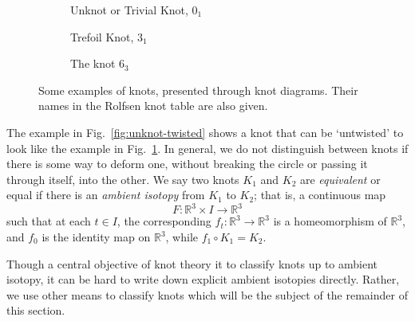 \documentclass[12pt]{report}
\newcommand{\R}{\mathbb{R}}
\theoremstyle{upright}
\begin{document}
\begin{figure}[hbt!]
	\centering
	\hspace*{\fill}
	\begin{subfigure}[b]{0.3 \textwidth}
		\centering
		\def\svgscale{0.2}
		
		\caption{Unknot or Trivial Knot, $0_{1}$}
		\label{fig:unknot}
	\end{subfigure}
	\hspace*{\fill}
	\begin{subfigure}[b]{0.3 \textwidth}
		\centering
		\def\svgscale{0.2}
		
		\caption{Trefoil Knot, $3_{1}$}
		\label{fig:trefoil}
	\end{subfigure}
	\hspace*{\fill}
	\begin{subfigure}[b]{0.3 \textwidth}
		\centering
		\def\svgscale{0.2}
		
		\caption{The knot $6_{3}$}
		\label{fig:6-3-knot}
	\end{subfigure}
	\caption{Some examples of knots, presented through knot diagrams. Their names in the Rolfsen knot table are also given.}
	\label{fig:knot-examples}
	\hspace*{\fill} 
\end{figure}

The example in Fig.~\ref{fig:unknot-twisted} shows a knot that can be `untwisted' to look like the example in Fig.~\ref{fig:unknot}. In general, we do not distinguish between knots if there is some way to deform one, without breaking the circle or passing it through itself, into the other. We say two knots $K_{1}$ and $K_{2}$ are \textit{equivalent} or equal if there is an \textit{ambient isotopy} from $K_{1}$ to $K_{2}$; that is, a continuous map
\[F: \R^{3} \times I \longrightarrow \R^{3}\]
such that at each $t \in I$, the corresponding $f_{t}: \R^{3} \longrightarrow \R^{3}$ is a homeomorphism of $\R^{3}$, and $f_{0}$ is the identity map on $\R^{3}$, while $f_{1} \circ K_{1} = K_{2}$.

Though a central objective of knot theory it to classify knots up to ambient isotopy, it can be hard to write down explicit ambient isotopies directly. Rather, we use other means to classify knots which will be the subject of the remainder of this section.
\end{document}

